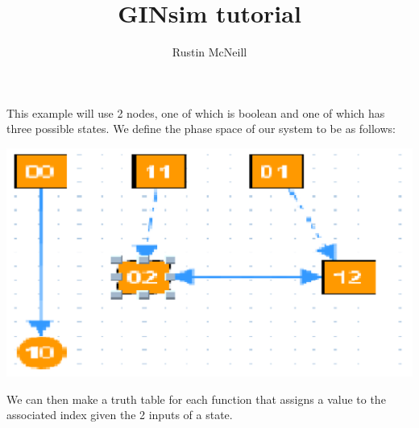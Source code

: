 \documentclass[12pt]{article}
\begin{document}
\title{GINsim tutorial}
\author{Rustin McNeill}
\maketitle

This example will use 2 nodes, one of which is boolean and one of which has three possible 
states. We define the phase space of our system to be as follows:

\begin{center}
\includegraphics[scale=.15]{2x3ss.png}
\end{center}



We can then make a truth table for each function that assigns a value to the associated index 
given the 2 inputs of a state. 
\end{document}
